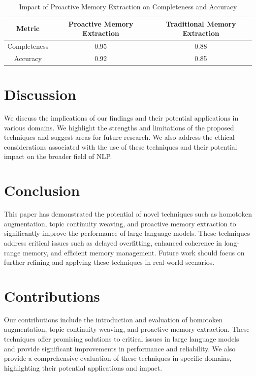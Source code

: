 \documentclass{article}
\begin{document}
\begin{table}[h!]
\centering
\begin{tabular}{|c|c|c|}
\hline
\textbf{Metric} & \textbf{Proactive Memory Extraction} & \textbf{Traditional Memory Extraction} \\ \hline
Completeness & 0.95 & 0.88 \\ \hline
Accuracy & 0.92 & 0.85 \\ \hline
\end{tabular}
\caption{Impact of Proactive Memory Extraction on Completeness and Accuracy}
\label{tab:proactive}
\end{table}

\section{Discussion}
We discuss the implications of our findings and their potential applications in various domains. We highlight the strengths and limitations of the proposed techniques and suggest areas for future research. We also address the ethical considerations associated with the use of these techniques and their potential impact on the broader field of NLP.

\section{Conclusion}
This paper has demonstrated the potential of novel techniques such as homotoken augmentation, topic continuity weaving, and proactive memory extraction to significantly improve the performance of large language models. These techniques address critical issues such as delayed overfitting, enhanced coherence in long-range memory, and efficient memory management. Future work should focus on further refining and applying these techniques in real-world scenarios.

\section{Contributions}
Our contributions include the introduction and evaluation of homotoken augmentation, topic continuity weaving, and proactive memory extraction. These techniques offer promising solutions to critical issues in large language models and provide significant improvements in performance and reliability. We also provide a comprehensive evaluation of these techniques in specific domains, highlighting their potential applications and impact.
\end{document}
